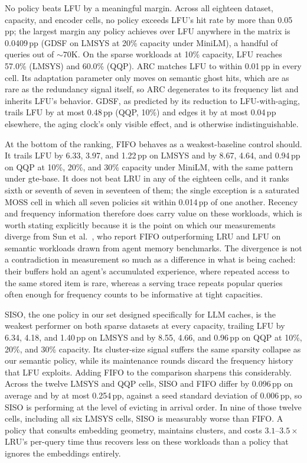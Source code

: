 \documentclass[sigconf,nonacm]{acmart}
\begin{document}
No policy beats LFU by a meaningful margin. Across all eighteen dataset, capacity, and encoder cells, no policy exceeds LFU's hit rate by more than 0.05\,pp; the largest margin any policy achieves over LFU anywhere in the matrix is 0.0409\,pp (GDSF on LMSYS at 20\% capacity under MiniLM), a handful of queries out of ${\sim}70$K. On the sparse workloads at 10\% capacity, LFU reaches 57.0\% (LMSYS) and 60.0\% (QQP). ARC matches LFU to within 0.01\,pp in every cell. Its adaptation parameter only moves on semantic ghost hits, which are as rare as the redundancy signal itself, so ARC degenerates to its frequency list and inherits LFU's behavior. GDSF, as predicted by its reduction to LFU-with-aging, trails LFU by at most 0.48\,pp (QQP, 10\%) and edges it by at most 0.04\,pp elsewhere, the aging clock's only visible effect, and is otherwise indistinguishable.

At the bottom of the ranking, FIFO behaves as a weakest-baseline control should. It trails LFU by 6.33, 3.97, and 1.22\,pp on LMSYS and by 8.67, 4.64, and 0.94\,pp on QQP at 10\%, 20\%, and 30\% capacity under MiniLM, with the same pattern under gte-base. It does not beat LRU in any of the eighteen cells, and it ranks sixth or seventh of seven in seventeen of them; the single exception is a saturated MOSS cell in which all seven policies sit within 0.014\,pp of one another. Recency and frequency information therefore does carry value on these workloads, which is worth stating explicitly because it is the point on which our measurements diverge from Sun et al.\ \cite{sun2026solar}, who report FIFO outperforming LRU and LFU on semantic workloads drawn from agent memory benchmarks. The divergence is not a contradiction in measurement so much as a difference in what is being cached: their buffers hold an agent's accumulated experience, where repeated access to the same stored item is rare, whereas a serving trace repeats popular queries often enough for frequency counts to be informative at tight capacities.

SISO, the one policy in our set designed specifically for LLM caches, is the weakest performer on both sparse datasets at every capacity, trailing LFU by 6.34, 4.18, and 1.40\,pp on LMSYS and by 8.55, 4.66, and 0.96\,pp on QQP at 10\%, 20\%, and 30\% capacity. Its cluster-size signal suffers the same sparsity collapse as our semantic policy, while its maintenance rounds discard the frequency history that LFU exploits. Adding FIFO to the comparison sharpens this considerably. Across the twelve LMSYS and QQP cells, SISO and FIFO differ by 0.096\,pp on average and by at most 0.254\,pp, against a seed standard deviation of 0.006\,pp, so SISO is performing at the level of evicting in arrival order. In nine of those twelve cells, including all six LMSYS cells, SISO is measurably worse than FIFO. A policy that consults embedding geometry, maintains clusters, and costs $3.1$--$3.5\times$ LRU's per-query time thus recovers less on these workloads than a policy that ignores the embeddings entirely.
\end{document}
